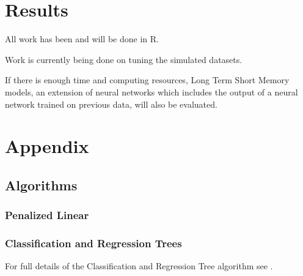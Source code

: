 \documentclass[a4paper, table]{article}
\begin{document}
\section{Results}

All work has been and will be done in R.

Work is currently being done on tuning the simulated datasets.

If there is enough time and computing resources, Long Term Short Memory models, an extension of neural networks which includes the output of a neural network trained on previous data, will also be evaluated.

\section{Appendix}

\subsection{Algorithms}
\label{Algorithms}

\subsubsection{Penalized Linear}

\subsubsection{Classification and Regression Trees}

For full details of the Classification and Regression Tree algorithm see \cite{breiman_classification_1984}. 
\end{document}
